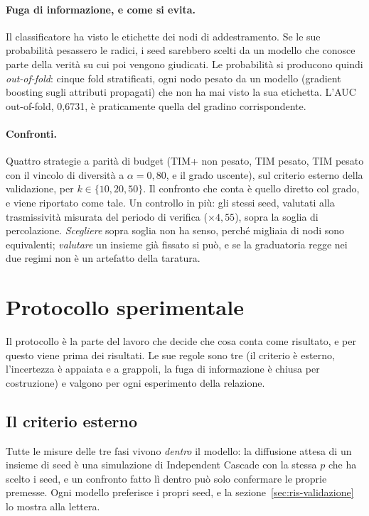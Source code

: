 \documentclass[11pt,a4paper]{article}
\begin{document}
\paragraph{Fuga di informazione, e come si evita.} Il classificatore ha visto le etichette dei nodi di addestramento. Se le sue probabilità pesassero le radici, i seed sarebbero scelti da un modello che conosce parte della verità su cui poi vengono giudicati. Le probabilità si producono quindi \emph{out-of-fold}: cinque fold stratificati, ogni nodo pesato da un modello (gradient boosting sugli attributi propagati) che non ha mai visto la sua etichetta. L'AUC out-of-fold, 0,6731, è praticamente quella del gradino corrispondente.

\paragraph{Confronti.} Quattro strategie a parità di budget (TIM+ non pesato, TIM pesato, TIM pesato con il vincolo di diversità a $\alpha = 0{,}80$, e il grado uscente), sul criterio esterno della validazione, per $k \in \{10, 20, 50\}$. Il confronto che conta è quello diretto col grado, e viene riportato come tale. Un controllo in più: gli stessi seed, valutati alla trasmissività misurata del periodo di verifica ($\times 4{,}55$), sopra la soglia di percolazione. \emph{Scegliere} sopra soglia non ha senso, perché migliaia di nodi sono equivalenti; \emph{valutare} un insieme già fissato si può, e se la graduatoria regge nei due regimi non è un artefatto della taratura.

\clearpage
\section{Protocollo sperimentale}
\label{sec:protocollo}

Il protocollo è la parte del lavoro che decide che cosa conta come risultato, e per questo viene prima dei risultati. Le sue regole sono tre (il criterio è esterno, l'incertezza è appaiata e a grappoli, la fuga di informazione è chiusa per costruzione) e valgono per ogni esperimento della relazione.

\subsection{Il criterio esterno}
Tutte le misure delle tre fasi vivono \emph{dentro} il modello: la diffusione attesa di un insieme di seed è una simulazione di Independent Cascade con la stessa $p$ che ha scelto i seed, e un confronto fatto lì dentro può solo confermare le proprie premesse. Ogni modello preferisce i propri seed, e la sezione~\ref{sec:ris-validazione} lo mostra alla lettera.
\end{document}
